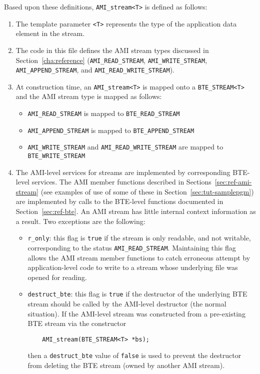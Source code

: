 Based upon these definitions, \lstinline|AMI_stream<T>| is defined
as follows:

\begin{enumerate}
  
\item The template parameter \lstinline|<T>| represents the type of
  the application data element in the stream.
  
\item The code in this file defines the AMI stream types discussed
  in Section~\ref{cha:reference} (\lstinline|AMI_READ_STREAM|,
  \lstinline|AMI_WRITE_STREAM|, \lstinline|AMI_APPEND_STREAM|, and
  \lstinline|AMI_READ_WRITE_STREAM|).
  
\item At construction time, an \lstinline|AMI_stream<T>| is
  mapped onto a \lstinline|BTE_STREAM<T>| and the AMI stream type is
  mapped as follows:
  
  \begin{itemize}
  \item \lstinline|AMI_READ_STREAM| is mapped to
    \lstinline|BTE_READ_STREAM|
  \item \lstinline|AMI_APPEND_STREAM| is mapped to
    \lstinline|BTE_APPEND_STREAM|
  \item \lstinline|AMI_WRITE_STREAM| and
    \lstinline|AMI_READ_WRITE_STREAM| are mapped to
    \lstinline|BTE_WRITE_STREAM|
  \end{itemize}
  
\item The AMI-level services for streams are implemented by
  corresponding BTE-level services. The AMI member functions
  described in Sections~\ref{sec:ref-ami-stream} (see examples of
  use of some of these in Section~\ref{sec:tut-samplepgm}) are
  implemented by calls to the BTE-level functions documented in
  Section~\ref{sec:ref-bte}. An AMI stream has little internal
  context information as a result. Two exceptions are the following:
  
  \begin{itemize}
  \item \lstinline|r_only|: this flag is \lstinline|true| if the
    stream is only readable, and not writable, corresponding to the
    status \lstinline|AMI_READ_STREAM|. Maintaining this flag allows
    the AMI stream member functions to catch erroneous attempt by
    application-level code to write to a stream whose underlying
    file was opened for reading.
    
  \item \lstinline|destruct_bte|: this flag is \lstinline|true| if
    the destructor of the underlying BTE stream should be called by
    the AMI-level destructor (the normal situation). If the
    AMI-level stream was constructed from a pre-existing BTE stream
    via the constructor
\begin{lstlisting}
    AMI_stream(BTE_STREAM<T> *bs);
 \end{lstlisting}
    then a \lstinline|destruct_bte| value of \lstinline|false| is
    used to prevent the destructor from deleting the BTE stream
    (owned by another AMI stream).
  \end{itemize}
\end{enumerate}


